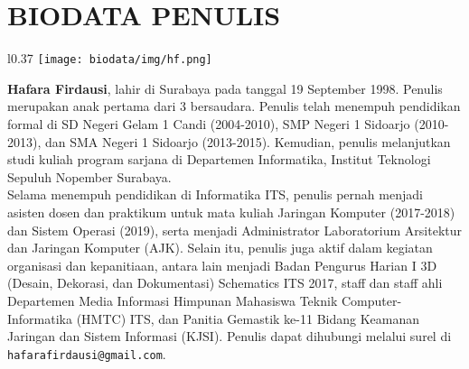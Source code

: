 \chapter{BIODATA PENULIS}
\begin{wrapfigure}{l}{0.37\textwidth}
	\texttt{[image: biodata/img/hf.png]}
\end{wrapfigure}

\tab \textbf{Hafara Firdausi}, lahir di Surabaya pada tanggal 19 September 1998. Penulis merupakan anak pertama dari 3 bersaudara. Penulis telah menempuh pendidikan formal di SD Negeri Gelam 1 Candi (2004-2010), SMP Negeri 1 Sidoarjo (2010-2013), dan SMA Negeri 1 Sidoarjo (2013-2015). Kemudian, penulis melanjutkan studi kuliah program sarjana di Departemen Informatika, Institut Teknologi Sepuluh Nopember Surabaya.\\
\tab Selama menempuh pendidikan di Informatika ITS, penulis pernah menjadi asisten dosen dan praktikum untuk mata kuliah Jaringan Komputer (2017-2018) dan Sistem Operasi (2019), serta menjadi Administrator Laboratorium Arsitektur dan Jaringan Komputer (AJK). Selain itu, penulis juga aktif dalam kegiatan organisasi dan kepanitiaan, antara lain menjadi Badan Pengurus Harian I 3D (Desain, Dekorasi, dan Dokumentasi) Schematics ITS 2017, staff dan staff ahli Departemen Media Informasi Himpunan Mahasiswa Teknik Computer-Informatika (HMTC) ITS, dan Panitia Gemastik ke-11 Bidang Keamanan Jaringan dan Sistem Informasi (KJSI). Penulis dapat dihubungi melalui surel di  \texttt{hafarafirdausi@gmail.com}.